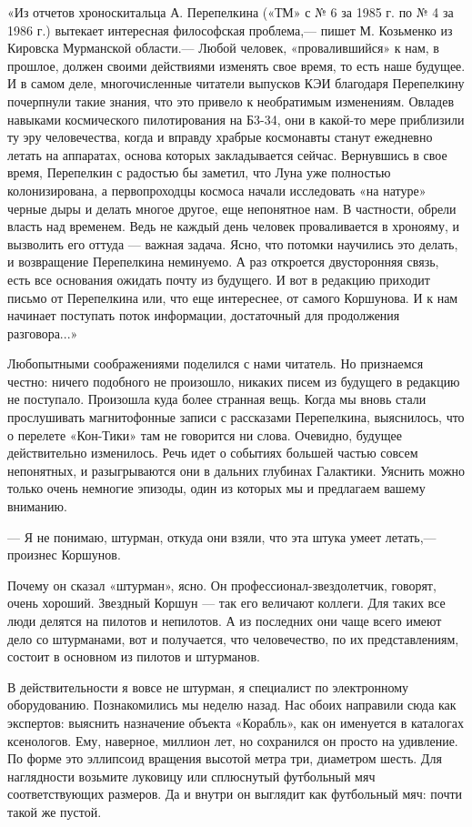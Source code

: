 \documentclass[11pt,a4paper,oneside]{article}
\begin{document}
«Из отчетов хроноскитальца А. Перепелкина («ТМ» с № 6 за 1985 г. по № 4 за 1986 г.) вытекает интересная философская проблема,— пишет М. Козьменко из Кировска Мурманской области.— Любой человек, «провалившийся» к нам, в прошлое, должен своими действиями изменять свое время, то есть наше будущее. И в самом деле, многочисленные читатели выпусков КЭИ благодаря Перепелкину почерпнули такие знания, что это привело к необратимым изменениям. Овладев навыками космического пилотирования на Б3-34, они в какой-то мере приблизили ту эру человечества, когда и вправду храбрые космонавты станут ежедневно летать на аппаратах, основа которых закладывается сейчас. Вернувшись в свое время, Перепелкин с радостью бы заметил, что Луна уже полностью колонизирована, а первопроходцы космоса начали исследовать «на натуре» черные дыры и делать многое другое, еще непонятное нам. В частности, обрели власть над временем. Ведь не каждый день человек проваливается в хронояму, и вызволить его оттуда — важная задача. Ясно, что потомки научились это делать, и возвращение Перепелкина неминуемо. А раз откроется двусторонняя связь, есть все основания ожидать почту из будущего. И вот в редакцию приходит письмо от Перепелкина или, что еще интереснее, от самого Коршунова. И к нам начинает поступать поток информации, достаточный для продолжения разговора...»

Любопытными соображениями поделился с нами читатель. Но признаемся честно: ничего подобного не произошло, никаких писем из будущего в редакцию не поступало. Произошла куда более странная вещь. Когда мы вновь стали прослушивать магнитофонные записи с рассказами Перепелкина, выяснилось, что о перелете «Кон-Тики» там не говорится ни слова. Очевидно, будущее действительно изменилось. Речь идет о событиях большей частью совсем непонятных, и разыгрываются они в дальних глубинах Галактики. Уяснить можно только очень немногие эпизоды, один из которых мы и предлагаем вашему вниманию.

— Я не понимаю, штурман, откуда они взяли, что эта штука умеет летать,— произнес Коршунов.

Почему он сказал «штурман», ясно. Он профессионал-звездолетчик, говорят, очень хороший. Звездный Коршун — так его величают коллеги. Для таких все люди делятся на пилотов и непилотов. А из последних они чаще всего имеют дело со штурманами, вот и получается, что человечество, по их представлениям, состоит в основном из пилотов и штурманов.

В действительности я вовсе не штурман, я специалист по электронному оборудованию. Познакомились мы неделю назад. Нас обоих направили сюда как экспертов: выяснить назначение объекта «Корабль», как он именуется в каталогах ксенологов. Ему, наверное, миллион лет, но сохранился он просто на удивление. По форме это эллипсоид вращения высотой метра три, диаметром шесть. Для наглядности возьмите луковицу или сплюснутый футбольный мяч соответствующих размеров. Да и внутри он выглядит как футбольный мяч: почти такой же пустой.
\end{document}
